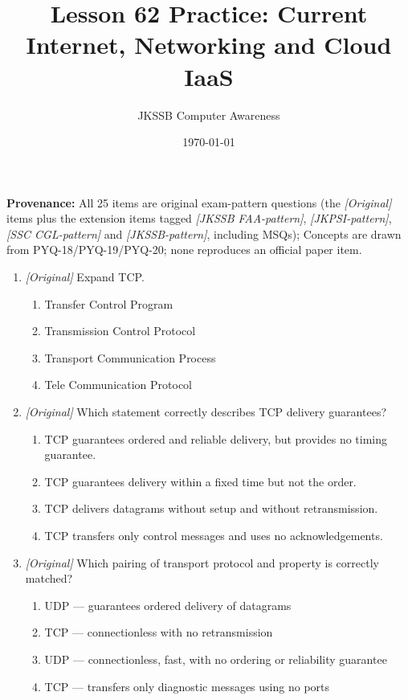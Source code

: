 \documentclass[11pt]{article}
\title{Lesson 62 Practice: Current Internet, Networking and Cloud IaaS}
\author{JKSSB Computer Awareness}
\date{\today}
\begin{document}
\maketitle
\noindent\textbf{Provenance:} All 25 items are original exam-pattern questions (the \textit{[Original]} items plus the extension items tagged \textit{[JKSSB FAA-pattern]}, \textit{[JKPSI-pattern]}, \textit{[SSC CGL-pattern]} and \textit{[JKSSB-pattern]}, including MSQs); Concepts are drawn from PYQ-18/PYQ-19/PYQ-20; none reproduces an official paper item.


\begin{enumerate}[label=\textbf{Q\arabic*.}, leftmargin=*]
\item \textit{[Original]} Expand TCP.
  \begin{enumerate}[label=\Alph*.]
    \item Transfer Control Program
    \item Transmission Control Protocol
    \item Transport Communication Process
    \item Tele Communication Protocol
  \end{enumerate}
\item \textit{[Original]} Which statement correctly describes TCP delivery
  guarantees?
  \begin{enumerate}[label=\Alph*.]
    \item TCP guarantees ordered and reliable delivery, but provides no timing
      guarantee.
    \item TCP guarantees delivery within a fixed time but not the order.
    \item TCP delivers datagrams without setup and without retransmission.
    \item TCP transfers only control messages and uses no acknowledgements.
  \end{enumerate}
\item \textit{[Original]} Which pairing of transport protocol and property is
  correctly matched?
  \begin{enumerate}[label=\Alph*.]
    \item UDP --- guarantees ordered delivery of datagrams
    \item TCP --- connectionless with no retransmission
    \item UDP --- connectionless, fast, with no ordering or reliability
      guarantee
    \item TCP --- transfers only diagnostic messages using no ports
  \end{enumerate}

\end{enumerate}
\end{document}
